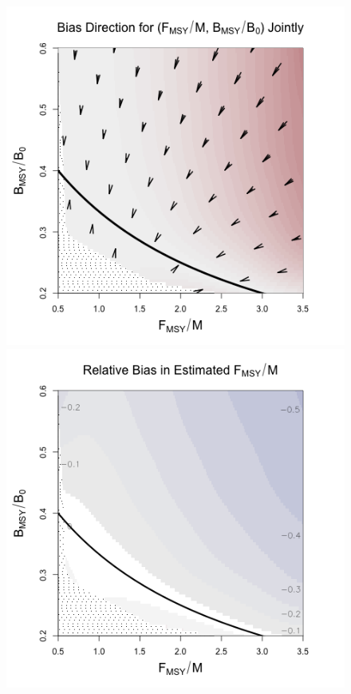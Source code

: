 \begin{figure}[h!]
\begin{minipage}[h!]{0.49\textwidth}
{}
$~$\\$~$\\
\end{minipage}
\begin{minipage}[h!]{0.49\textwidth}
\hspace*{1cm}
\includegraphics[width=1.1\textwidth]{../gpBias/directionalBiasSchnuteSubTitleExpT45N150Wide.png}\\
\hspace*{1cm}
\includegraphics[width=1.1\textwidth]{../gpBias/fMSYRelBiasSchnuteExpT45N150Wide.png}
\end{minipage}
\end{figure}

